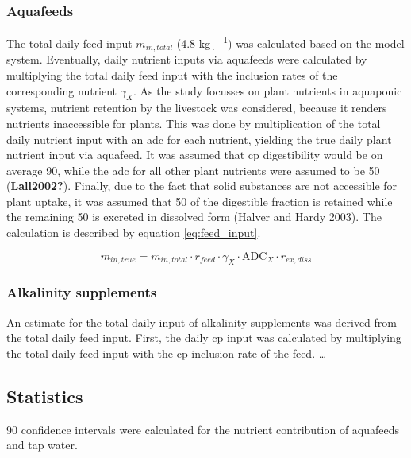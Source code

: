 \documentclass[preprint, 3p,
authoryear]{elsarticle} %
\begin{document}
\hypertarget{aquafeeds}{%
\subsubsection{Aquafeeds}\label{aquafeeds}}

The total daily feed input \(m_{in,total}\) (4.8 \si{\kg\per\d}) was
calculated based on the model system. Eventually, daily nutrient inputs
via aquafeeds were calculated by multiplying the total daily feed input
with the inclusion rates of the corresponding nutrient \(\gamma_{X}\).
As the study focusses on plant nutrients in aquaponic systems, nutrient
retention by the livestock was considered, because it renders nutrients
inaccessible for plants. This was done by multiplication of the total
daily nutrient input with an \gls{adc} for each nutrient, yielding the
true daily plant nutrient input via aquafeed. It was assumed that
\gls{cp} digestibility would be on average \SI{90}{\p}, while the
\gls{adc} for all other plant nutrients were assumed to be \SI{50}{\p}
(\textbf{Lall2002?}). Finally, due to the fact that solid substances are
not accessible for plant uptake, it was assumed that \SI{50}{\p} of the
digestible fraction is retained while the remaining \SI{50}{\p} is
excreted in dissolved form (Halver and Hardy 2003). The calculation is
described by equation \ref{eq:feed_input}.

\begin{equation}
  m_{in,true} = m_{in,total} \cdot r_{feed} \cdot \gamma_{X} \cdot \text{ADC}_{X} \cdot r_{ex,diss}
  \label{eq:feed_input}
\end{equation}

\hypertarget{alkalinity-supplements}{%
\subsubsection{Alkalinity supplements}\label{alkalinity-supplements}}

An estimate for the total daily input of alkalinity supplements was
derived from the total daily feed input. First, the daily \gls{cp} input
was calculated by multiplying the total daily feed input with the
\gls{cp} inclusion rate of the feed. \ldots{}

\hypertarget{statistics}{%
\subsection{Statistics}\label{statistics}}

\SI{90}{\p} confidence intervals were calculated for the nutrient
contribution of aquafeeds and tap water.
\end{document}
